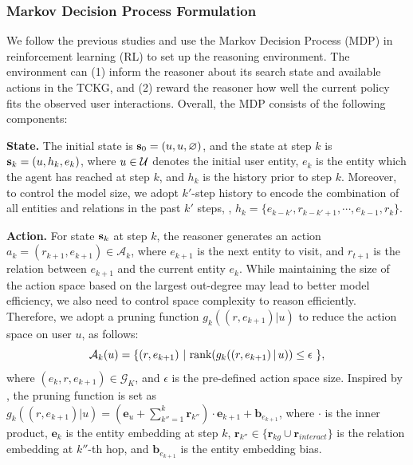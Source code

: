 \subsubsection{\textbf{Markov Decision Process Formulation}}\label{secMDP}
We follow the previous studies and use the Markov Decision Process (MDP) \cite{reinforcement} in reinforcement learning (RL) to set up the reasoning environment.
The environment can (1) inform the reasoner about its search state and available actions in the TCKG, and (2) reward the reasoner how well the current policy fits the observed user interactions. Overall, the MDP consists of the following components:

\textbf{State.} The initial state is $\textbf{s}_0 = (u, u, \varnothing)$, and the state at step $k$ is $\textbf{s}_k = (u, h_k, e_k)$, where $u \in \mathcal{U}$ denotes the initial user entity, $e_k$ is the entity which the agent has reached at step $k$, and $h_k$ is the history prior to step $k$. Moreover, to control the model size, we adopt $k'$-step history to encode the combination of all entities and relations in the past $k'$ steps, \ie, $h_k = \{e_{k-k'}, r_{k-k'+1},\cdots,e_{k-1},r_{k}\}$.


\textbf{Action.} For state $\textbf{s}_k$ at step $k$, the reasoner generates an action $a_k = (r_{k+1}, e_{k+1}) \in \mathcal{A}_k$, where $e_{k+1}$ is the next entity to visit, and $r_{t+1}$ is the relation between $e_{k+1}$ and the current entity $e_{k}$. While maintaining the size of the action space based on the largest out-degree may lead to better model efficiency, we also need to control space complexity to reason efficiently.
Therefore, we adopt a pruning function $g_k((r,e_{k+1})|u)$ to reduce the action space on user $u$, as follows:
\begin{equation}\label{actionprun}
\mathcal{A}_k(u) = \{(r,e_{k+1}) \ |\  \text{rank}(g_k((r,e_{k+1}) \, |\, u)) \leq \epsilon\ \},
\end{equation}
where $(e_k, r, e_{k+1}) \in \mathcal{G}_K$, and $\epsilon$ is the pre-defined action space size. Inspired by \cite{pgpr}, the pruning function is set as
%
$g_k((r, e_{k+1})|u) = (\boldsymbol{e}_u + \sum_{k''=1}^k\boldsymbol{r}_{k''}) \cdot \boldsymbol{e}_{k+1} + \boldsymbol{b}_{{e}_{k+1}}$, 
%
where $\cdot$ is the inner product, $\boldsymbol{e}_k$ is the entity embedding at step $k$, $\boldsymbol{r}_{k''} \in \{\boldsymbol{r}_{kg} \cup \boldsymbol{r}_{interact}  \}$ is the relation embedding at $k''$-th hop, and $\boldsymbol{b}_{{e}_{k+1}}$ is the entity embedding bias.



